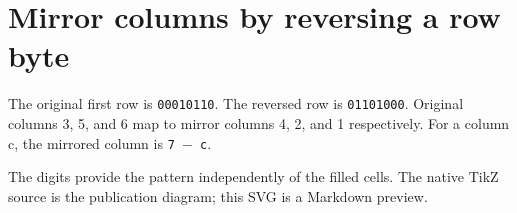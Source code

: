 \section{Mirror columns by reversing a row
  byte}\label{003-eight-byte-sprite-x-bit-order-mirror-columns-by-reversing-a-row-byte}

The original first row is \texttt{00010110}. The reversed row is
\texttt{01101000}. Original columns 3, 5, and 6 map to mirror columns 4,
2, and 1 respectively. For a column c, the mirrored column is
\texttt{7\ \ensuremath{-}\ c}.

The digits provide the pattern independently of the filled cells. The
native TikZ source is the publication diagram; this SVG is a Markdown
preview.


